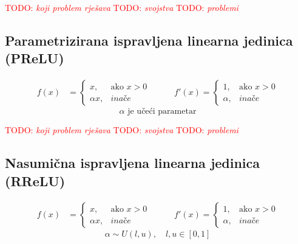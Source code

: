 \documentclass[times, utf8, diplomski]{fer}
\def\otherwise{\textit{inače}}
\def\TODO#1{\noindent\textcolor{red}{TODO: \textit{#1}}\newline}
\def\todo#1{\TODO{#1}}
\def\todoimg#1{\begin{center} \textcolor{red}{\big[ IMAGE: \textit{#1} \big]} \end{center}}
\begin{document}
\todo{koji problem rješava}
\todo{svojstva}
\todo{problemi}

\subsection{Parametrizirana ispravljena linearna jedinica (PReLU)}

\todoimg{}


\begin{equation}
\begin{split}
f(x) &= 
\begin{cases}
x,			& \text{ako } x > 0 \\
\alpha x,	& \otherwise
\end{cases}
\end{split}
\qquad
\begin{split}
f'(x) = 
\begin{cases}
1,		& \text{ako } x > 0 \\
\alpha,	& \otherwise
\end{cases}
\end{split}
\end{equation}
\begin{equation*}
\alpha \text{ je učeći parametar}
\end{equation*}

\todo{koji problem rješava}
\todo{svojstva}
\todo{problemi}

\subsection{Nasumična ispravljena linearna jedinica (RReLU)}

\todoimg{}

\begin{equation}
\begin{split}
f(x) &= 
\begin{cases}
x,			& \text{ako } x > 0 \\
\alpha x,	& \otherwise
\end{cases}
\end{split}
\qquad
\begin{split}
f'(x) = 
\begin{cases}
1,		& \text{ako } x > 0 \\
\alpha,	& \otherwise
\end{cases}
\end{split}
\end{equation}
\begin{equation}
\alpha \sim U(l,u),\quad l,u \in [0,1]
\end{equation}
\end{document}
